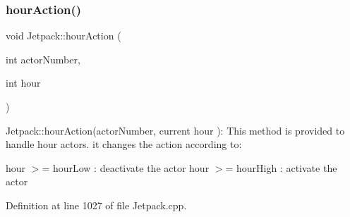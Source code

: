 \subsubsection{\texorpdfstring{hour\+Action()}{hourAction()}}
{\footnotesize\ttfamily void Jetpack\+::hour\+Action (\begin{DoxyParamCaption}\item[{int}]{actor\+Number,  }\item[{int}]{hour }\end{DoxyParamCaption})}

Jetpack\+::hour\+Action(actor\+Number, current hour )\+: This method is provided to handle hour actors. it changes the action according to\+:

hour $>$= hour\+Low \+: deactivate the actor hour $>$= hour\+High \+: activate the actor 

Definition at line 1027 of file Jetpack.\+cpp.


